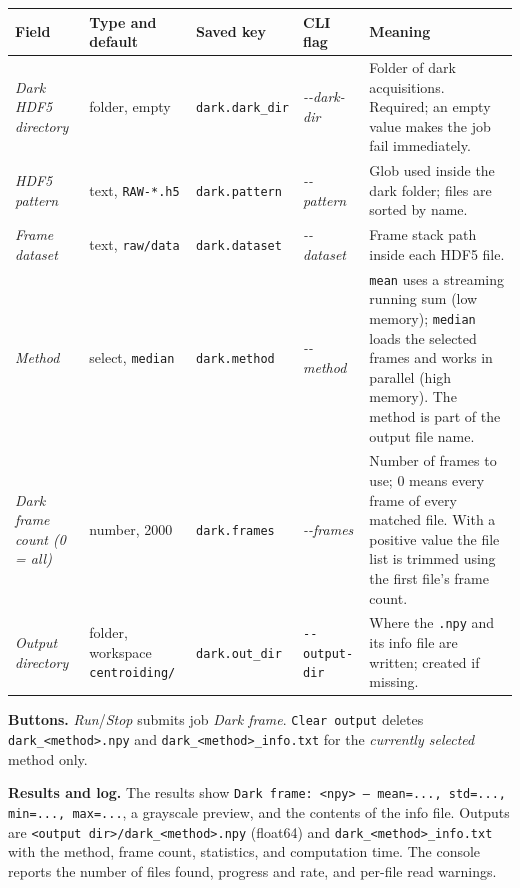 \documentclass[11pt,a4paper]{article}
\newcommand{\code}[1]{\texttt{#1}}
\begin{document}
\begin{center}
\footnotesize
\begin{longtable}{@{}L{3.4cm}L{2.3cm}L{2.5cm}L{2.8cm}L{4.9cm}@{}}
\toprule
Field & Type and default & Saved key & CLI flag & Meaning \\
\midrule
\endhead
\bottomrule
\endfoot
\emph{Dark HDF5 directory} & folder, empty & \code{dark.\allowbreak{}dark\_\allowbreak{}dir} &
\emph{-\allowbreak{}-\allowbreak{}dark-\allowbreak{}dir} & Folder of dark acquisitions. Required; an empty value
makes the job fail immediately. \\
\addlinespace
\emph{HDF5 pattern} & text, \code{RAW-\allowbreak{}*.\allowbreak{}h5} & \code{dark.\allowbreak{}pattern} &
\emph{-\allowbreak{}-\allowbreak{}pattern} & Glob used inside the dark folder; files are sorted by
name. \\
\addlinespace
\emph{Frame dataset} & text, \code{raw/\allowbreak{}data} & \code{dark.\allowbreak{}dataset} &
\emph{-\allowbreak{}-\allowbreak{}dataset} & Frame stack path inside each HDF5 file. \\
\addlinespace
\emph{Method} & select, \code{median} & \code{dark.\allowbreak{}method} &
\emph{-\allowbreak{}-\allowbreak{}method} & \code{mean} uses a streaming running sum (low memory);
\code{median} loads the selected frames and works in parallel (high memory).
The method is part of the output file name. \\
\addlinespace
\emph{Dark frame count (0 = all)} & number, 2000 & \code{dark.\allowbreak{}frames} &
\emph{-\allowbreak{}-\allowbreak{}frames} & Number of frames to use; 0 means every frame of every
matched file. With a positive value the file list is trimmed using the
first file's frame count. \\
\addlinespace
\emph{Output directory} & folder, workspace \code{centroiding/\allowbreak{}} &
\code{dark.out\_\allowbreak{}dir} & \code{-\allowbreak{}-\allowbreak{}output-\allowbreak{}dir} & Where the \code{.\allowbreak{}npy} and its
info file are written; created if missing. \\
\end{longtable}
\end{center}

\textbf{Buttons.} \emph{Run}/\emph{Stop} submits job \emph{Dark frame}.
\code{Clear output} deletes \code{dark\_\allowbreak{}<method>.\allowbreak{}npy} and
\code{dark\_\allowbreak{}<method>\_\allowbreak{}info.txt} for the \emph{currently selected} method
only.

\textbf{Results and log.} The results show
\code{Dark frame: <npy> --- mean=..., std=..., min=..., max=...}, a grayscale
preview, and the contents of the info file. Outputs are
\code{<output dir>/\allowbreak{}dark\_\allowbreak{}<method>.npy} (float64) and
\code{dark\_\allowbreak{}<method>\_\allowbreak{}info.txt} with the method, frame count, statistics,
and computation time. The console reports the number of files found, progress
and rate, and per-file read warnings.
\end{document}
